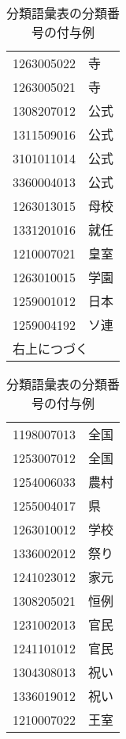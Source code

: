 \begin{enumerate}
\begin{table}[t]
    \caption{分類語彙表の分類番号の付与例}
    \label{tab:huyo_bgh_rei}
  \begin{center}
\small\renewcommand{\arraystretch}{}
\begin{tabular}[c]{|ll|}\hline
1263005022 & 寺\\
1263005021 & 寺\\
1308207012 & 公式\\
1311509016 & 公式\\
3101011014 & 公式\\
3360004013 & 公式\\
1263013015 & 母校\\
1331201016 & 就任\\
1210007021 & 皇室\\
1263010015 & 学園\\
1259001012 & 日本\\
1259004192 & ソ連\\
\multicolumn{2}{|l|}{右上につづく}\\\hline
\end{tabular}
\begin{tabular}[c]{|ll|}\hline
1198007013 & 全国\\
1253007012 & 全国\\
1254006033 & 農村\\
1255004017 & 県\\
1263010012 & 学校\\
1336002012 & 祭り\\
1241023012 & 家元\\
1308205021 & 恒例\\
1231002013 & 官民\\
1241101012 & 官民\\
1304308013 & 祝い\\
1336019012 & 祝い\\
1210007022 & 王室\\\hline
\end{tabular}
\end{center}
\end{table}



\end{enumerate}
